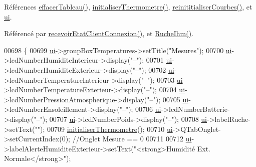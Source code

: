 Références \hyperlink{class_ruche_ihm_a386868ba4e6e37b9d877fe3ab330e605}{effacer\+Tableau()}, \hyperlink{class_ruche_ihm_afb64cca9f0e46c25487ef059a4826d49}{initialiser\+Thermometre()}, \hyperlink{class_ruche_ihm_a098911c0edd701f7892e3d140ebffbd9}{reinititialiser\+Courbes()}, et \hyperlink{class_ruche_ihm_a64786058bd7f88ca2f1e9743bb27c25b}{ui}.



Référencé par \hyperlink{class_ruche_ihm_a3a3dae9de8c51344aa6e3463db9e6ad9}{recevoir\+Etat\+Client\+Connexion()}, et \hyperlink{class_ruche_ihm_a04c2544ba4e9cca6c38f553c32d63dee}{Ruche\+Ihm()}.


\begin{DoxyCode}
00698 \{
00699     \hyperlink{class_ruche_ihm_a64786058bd7f88ca2f1e9743bb27c25b}{ui}->groupBoxTemperatures->setTitle(\textcolor{stringliteral}{"Mesures"});
00700     \hyperlink{class_ruche_ihm_a64786058bd7f88ca2f1e9743bb27c25b}{ui}->lcdNumberHumiditeInterieur->display(\textcolor{stringliteral}{"--"});
00701     \hyperlink{class_ruche_ihm_a64786058bd7f88ca2f1e9743bb27c25b}{ui}->lcdNumberHumiditeExterieur->display(\textcolor{stringliteral}{"--"});
00702     \hyperlink{class_ruche_ihm_a64786058bd7f88ca2f1e9743bb27c25b}{ui}->lcdNumberTemperatureInterieur->display(\textcolor{stringliteral}{"--"});
00703     \hyperlink{class_ruche_ihm_a64786058bd7f88ca2f1e9743bb27c25b}{ui}->lcdNumberTemperatureExterieur->display(\textcolor{stringliteral}{"--"});
00704     \hyperlink{class_ruche_ihm_a64786058bd7f88ca2f1e9743bb27c25b}{ui}->lcdNumberPressionAtmospherique->display(\textcolor{stringliteral}{"--"});
00705     \hyperlink{class_ruche_ihm_a64786058bd7f88ca2f1e9743bb27c25b}{ui}->lcdNumberEnsoleillement->display(\textcolor{stringliteral}{"--"});
00706     \hyperlink{class_ruche_ihm_a64786058bd7f88ca2f1e9743bb27c25b}{ui}->lcdNumberBatterie->display(\textcolor{stringliteral}{"--"});
00707     \hyperlink{class_ruche_ihm_a64786058bd7f88ca2f1e9743bb27c25b}{ui}->lcdNumberPoids->display(\textcolor{stringliteral}{"--"});
00708     \hyperlink{class_ruche_ihm_a64786058bd7f88ca2f1e9743bb27c25b}{ui}->labelRuche->setText(\textcolor{stringliteral}{""});
00709     \hyperlink{class_ruche_ihm_afb64cca9f0e46c25487ef059a4826d49}{initialiserThermometre}();
00710     \hyperlink{class_ruche_ihm_a64786058bd7f88ca2f1e9743bb27c25b}{ui}->QTabOnglet->setCurrentIndex(0); \textcolor{comment}{//Onglet Mesure == 0}
00711 
00712     \hyperlink{class_ruche_ihm_a64786058bd7f88ca2f1e9743bb27c25b}{ui}->labelAlerteHumiditeExterieur->setText(\textcolor{stringliteral}{"<strong>Humidité Ext. Normale</strong>"});

\end{DoxyCode}
